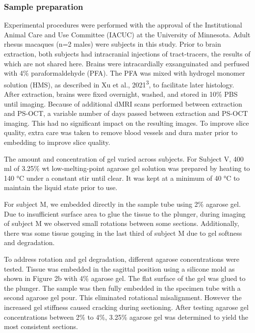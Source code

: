 \documentclass{article}
\begin{document}
\subsubsection*{Sample preparation}

Experimental procedures were performed with the approval of the Institutional Animal Care and Use Committee (IACUC) at the University of Minnesota. Adult rhesus macaques (n=2 males) were subjects in this study. Prior to brain extraction, both subjects had intracranial injections of tract-tracers, the results of which are not shared here. Brains were intracardially exsanguinated and perfused with 4\% paraformaldehyde (PFA). The PFA was mixed with hydrogel monomer solution (HMS), as described in Xu et al., 2021\textsuperscript{3}, to facilitate later histology. After extraction, brains were fixed overnight, washed, and stored in 10\% PBS until imaging. Because of additional dMRI scans performed between extraction and PS-OCT, a variable number of days passed between extraction and PS-OCT imaging. This had no significant impact on the resulting images. To improve slice quality, extra care was taken to remove blood vessels and dura mater prior to embedding to improve slice quality.

The amount and concentration of gel varied across subjects. For Subject V, 400 ml of 3.25\% wt low-melting-point agarose gel solution was prepared by heating to 140 °C under a constant stir until clear. It was kept at a minimum of 40 °C to maintain the liquid state prior to use.

For subject M, we embedded directly in the sample tube using 2\% agarose gel. Due to insufficient surface area to glue the tissue to the plunger, during imaging of subject M we observed small rotations between some sections. Additionally, there was some tissue gouging in the last third of subject M due to gel softness and degradation.

To address rotation and gel degradation, different agarose concentrations were tested. Tissue was embedded in the sagittal position using a silicone mold as shown in Figure 2b with 4\% agarose gel. The flat surface of the gel was glued to the plunger. The sample was then fully embedded in the specimen tube with a second agarose gel pour. This eliminated rotational misalignment. However the increased gel stiffness caused cracking during sectioning. After  testing agarose gel concentrations between 2\% to 4\%, 3.25\% agarose gel was determined to yield the most consistent sections.
\end{document}
